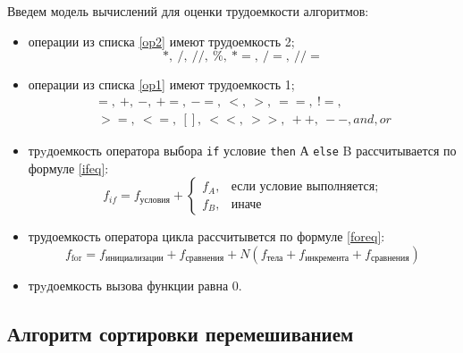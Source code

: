 Введем модель вычислений для оценки трудоемкости алгоритмов:
\begin{itemize}[left=\parindent]
    \item операции из списка \ref{op2} имеют трудоемкость 2;
        \begin{equation}\label{op2}
            *,~/,~//,~\%,~*=,~/=,~//=
        \end{equation}

    \item операции из списка \ref{op1} имеют трудоемкость 1;
        \begin{equation}\label{op1}
            \begin{aligned}
                =,~+,~-,~+=,~-=,~<,~>,~==,~!=,\\
                ~>=, ~<=,~[],~<<,~>>,~++,~--,and,or
            \end{aligned}
        \end{equation}

    \item трyдоемкость оператора выбора \texttt{if} условие \texttt{then} А
        \texttt{else} B рассчитывается по формуле \ref{ifeq}:
        \begin{equation}\label{ifeq}
            f_{if} = f_{условия} +
            \begin{cases}
                f_A, & \text{если условие выполняется;}\\
                f_B, & \text{иначе}
            \end{cases}
        \end{equation}

    \item трудоемкость оператора цикла рассчитывется по формуле \ref{foreq}:
        \begin{equation}\label{foreq}
            f_{\text{for}} = f_{\text{инициализации}} + f_{\text{сравнения}} +
                      N(f_{\text{тела}} + f_{\text{инкремента}} +
                      f_{\text{сравнения}})
        \end{equation}

    \item трyдоемкость вызова функции равна 0.
\end{itemize}

\subsection{Алгоритм сортировки перемешиванием}

